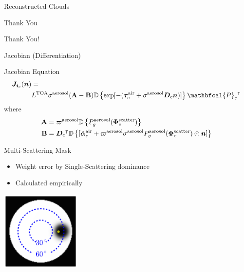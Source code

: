 \documentclass[compress,red,12pt]{beamer}
\newcommand{\vect}[1]{\bm{#1}}
\newcommand{\transpose}[1]{{#1}^\intercal}
\newcommand{\OpCamera}{\mathbfcal{P}}
\newcommand{\OpDiag}[1]{\mathbb{D}\left\{#1\right\}}
\begin{document}

\begin{frame}[label=current]{Reconstructed Clouds}
  \centerline{}
\end{frame}


\begin{frame}{Thank You}
  \begin{center}
    Thank You!
  \end{center}
\end{frame}


\appendix

\begin{frame}[label=jacobian]{Jacobian (Differentiation)}
  \begin{block}{Jacobian Equation}
    \begin{align*}
      {\bm J}_{{\bm i}_c}({\bm n}) &= \\
      &L^{\rm TOA}{\sigma}^{\rm
        aerosol}({\bf A}-{\bf B}) \OpDiag{\exp[-(\vect{\tau}_c^{\rm air} +
        {\sigma}^{\rm aerosol} {\bm D}_c {\bm n})]}
      \transpose{\OpCamera_c}
    \end{align*}
    where
    \begin{align*}
      {\bf A} &= \varpi^{\rm aerosol}
      \OpDiag{ P_g^{\rm aerosol}(\vect{\Phi}^{\rm scatter}_c)} \\
      {\bf B} &= \transpose{{\bm D}_c}
      \OpDiag{[\tilde{\vect{\alpha}}^{\rm air}_c + \varpi^{\rm
          aerosol}\sigma^{\rm aerosol} P^{\rm aerosol}_g(\vect{\Phi}^{\rm
          scatter}_c) \odot{\bm n}    ]}
    \end{align*}
  \end{block}
  \hfill\hyperlink{gradient}{}
\end{frame}

\begin{frame}[label=mask]{Multi-Scattering Mask}
  \begin{itemize}
  \item Weight error by Single-Scattering dominance
  \item Calculated empirically
  \end{itemize}
  \centerline{\includegraphics[height=4cm]{images/sun_mask.pdf}}
  \hfill\hyperlink{objective<3>}{} 
\end{frame}
\end{document}
